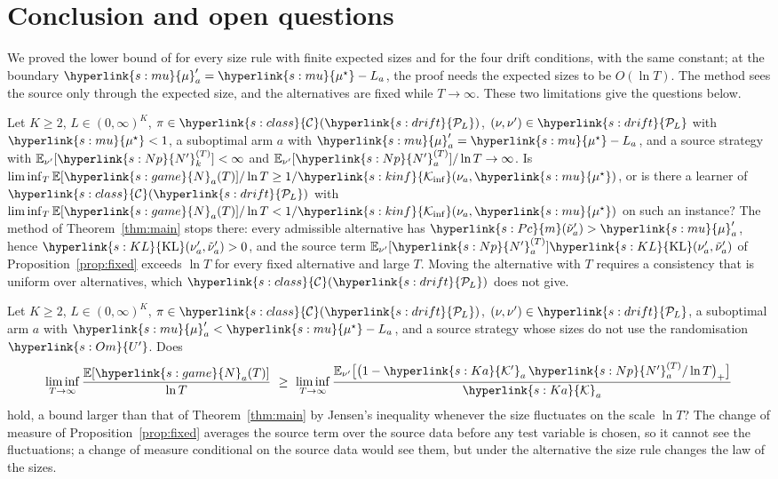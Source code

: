 \documentclass[11pt]{article}
\newcommand{\sy}[2]{\hyperlink{#1}{#2}}
\newcommand{\E}{\mathbb{E}}
\newcommand{\m}{\sy{s:Pc}{m}}
\newcommand{\KL}{\sy{s:KL}{\mathrm{KL}}}
\newcommand{\Kinf}{\sy{s:kinf}{\mathcal{K}_{\inf}}}
\newcommand{\mean}{\sy{s:mu}{\mu}}
\newcommand{\ms}{\sy{s:mu}{\mu^{\star}}}
\newcommand{\Up}{\sy{s:Om}{U'}}
\newcommand{\Np}{\sy{s:Np}{N'}}
\newcommand{\Nc}{\sy{s:game}{N}}
\newcommand{\PcL}{\sy{s:drift}{\mathcal{P}_{L}}}
\newcommand{\Cl}{\sy{s:class}{\mathcal{C}}}
\newcommand{\Ka}{\sy{s:Ka}{\mathcal{K}}}
\newcommand{\Kp}{\sy{s:Ka}{\mathcal{K}'}}
\begin{document}
\section{Conclusion and open questions}\label{sec:open}

We proved the lower bound of \citet[Theorem~2]{PMRM26} for every size rule with finite expected
sizes and for the four drift conditions, with the same constant; at the boundary
$\mean'_a=\ms-L_a$, the proof needs the expected sizes to be $O(\ln T)$. The method sees the
source only through the expected size, and the alternatives are fixed while $T\to\infty$. These
two limitations give the questions below.

\begin{openquestion}\label{oq:boundary}
Let $K\ge2$, $L\in(0,\infty)^K$, $\pi\in\Cl(\PcL)$, $(\nu,\nu')\in\PcL$ with $\ms<1$, a suboptimal
arm $a$ with $\mean'_a=\ms-L_a$, and a source strategy with $\E_{\nu'}[\Np^{(T)}_k]<\infty$ and
$\E_{\nu'}[\Np^{(T)}_a]/\ln T\to\infty$. Is
$\liminf_T\E[\Nc_a(T)]/\ln T\ge1/\Kinf(\nu_a,\ms)$, or is there a learner of $\Cl(\PcL)$ with
$\liminf_T\E[\Nc_a(T)]/\ln T<1/\Kinf(\nu_a,\ms)$ on such an instance? The method of
Theorem~\ref{thm:main} stops there: every admissible alternative has
$\m(\tilde\nu'_a)>\mean'_a$, hence $\KL(\nu'_a,\tilde\nu'_a)>0$, and the source term
$\E_{\nu'}[\Np^{(T)}_a]\KL(\nu'_a,\tilde\nu'_a)$ of Proposition~\ref{prop:fixed} exceeds $\ln T$
for every fixed alternative and large $T$. Moving the alternative with $T$ requires a consistency
that is uniform over alternatives, which $\Cl(\PcL)$ does not give.
\end{openquestion}

\begin{openquestion}\label{oq:fluctuations}
Let $K\ge2$, $L\in(0,\infty)^K$, $\pi\in\Cl(\PcL)$, $(\nu,\nu')\in\PcL$, a suboptimal arm $a$
with $\mean'_a<\ms-L_a$, and a source strategy whose sizes do not use the randomisation $\Up$. Does
\begin{equation*}
\liminf_{T\to\infty}\frac{\E[\Nc_a(T)]}{\ln T}\ \ge\ \liminf_{T\to\infty}
\frac{\E_{\nu'}\big[\big(1-\Kp_a\,\Np^{(T)}_a/\ln T\big)_+\big]}{\Ka_a}
\end{equation*}
hold, a bound larger than that of Theorem~\ref{thm:main} by Jensen's inequality whenever the size
fluctuates on the scale $\ln T$? The change of measure of Proposition~\ref{prop:fixed} averages the
source term over the source data before any test variable is chosen, so it cannot see the
fluctuations; a change of measure conditional on the source data would see them, but under the
alternative the size rule changes the law of the sizes.
\end{openquestion}
\end{document}
